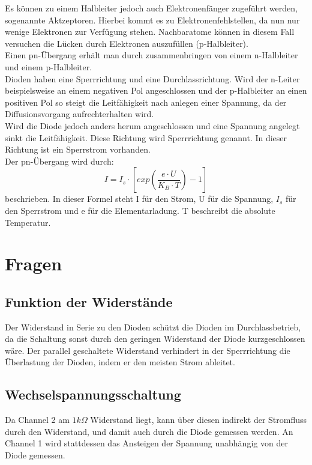 Es können zu einem Halbleiter jedoch auch Elektronenfänger zugeführt werden, sogenannte Aktzeptoren. Hierbei kommt es zu Elektronenfehlstellen, da nun nur wenige Elektronen zur Verfügung stehen. Nachbaratome können in diesem Fall versuchen die Lücken durch Elektronen auszufüllen (p-Halbleiter).\\
Einen pn-Übergang erhält man durch zusammenbringen von einem n-Halbleiter und einem p-Halbleiter.\\
Dioden haben eine Sperrrichtung und eine Durchlassrichtung. Wird der n-Leiter beispielsweise an einem negativen Pol angeschlossen und der p-Halbleiter an einen positiven Pol so steigt die Leitfähigkeit nach anlegen einer Spannung, da der Diffusionsvorgang aufrechterhalten wird.\\
Wird die Diode jedoch anders herum angeschlossen und eine Spannung angelegt sinkt die Leitfähigkeit. Diese Richtung wird Sperrrichtung genannt. In dieser Richtung  ist ein Sperrstrom vorhanden.\\
Der pn-Übergang wird durch:\\
\begin{equation}
I=I_s\cdot \left[exp\left(\frac{e\cdot U}{K_B\cdot T}\right)-1\right]
\end{equation}
beschrieben.  In dieser Formel steht I für den Strom, U für die Spannung, $I_s$ für den Sperrstrom und e für die Elementarladung. T beschreibt die absolute Temperatur.\\

\section{Fragen}
\subsection{Funktion der Widerstände}
Der Widerstand in Serie zu den Dioden schützt die Dioden im Durchlassbetrieb, da die Schaltung sonst durch den geringen Widerstand der Diode kurzgeschlossen wäre. Der parallel geschaltete Widerstand verhindert in der Sperrrichtung die Überlastung der Dioden, indem er den meisten Strom ableitet.

\subsection{Wechselspannungsschaltung}
Da Channel 2 am $1k\Omega$ Widerstand liegt, kann über diesen indirekt der Stromfluss durch den Widerstand, und damit auch durch die Diode gemessen werden. An Channel 1 wird stattdessen das Ansteigen der Spannung unabhängig von der Diode gemessen.
   \pagebreak